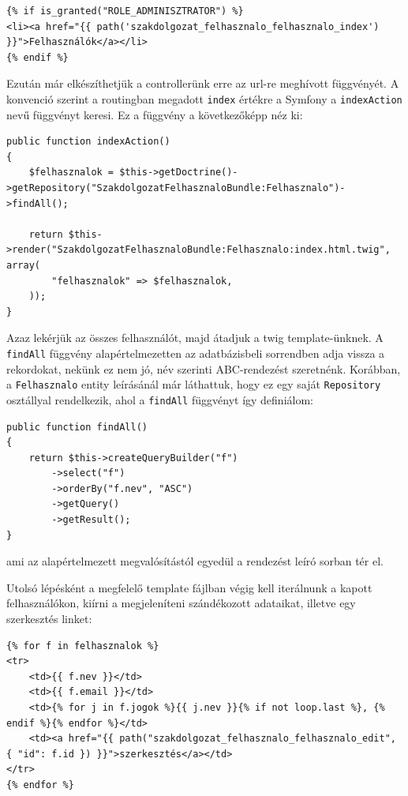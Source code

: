 \documentclass[a4paper,12pt,oneside]{report}
\begin{document}
\begin{lstlisting}
{% if is_granted("ROLE_ADMINISZTRATOR") %}
<li><a href="{{ path('szakdolgozat_felhasznalo_felhasznalo_index') }}">Felhasználók</a></li>
{% endif %}
\end{lstlisting}

Ezután már elkészíthetjük a controllerünk erre az url-re meghívott függvényét. A konvenció szerint a routingban megadott {\tt index} értékre a Symfony a {\tt indexAction} nevű függvényt keresi. Ez a függvény a következőképp néz ki:

\begin{lstlisting}
public function indexAction()
{
    $felhasznalok = $this->getDoctrine()->getRepository("SzakdolgozatFelhasznaloBundle:Felhasznalo")->findAll();

    return $this->render("SzakdolgozatFelhasznaloBundle:Felhasznalo:index.html.twig", array(
        "felhasznalok" => $felhasznalok,
    ));
}
\end{lstlisting}

Azaz lekérjük az összes felhasználót, majd átadjuk a twig template-ünknek. A {\tt findAll} függvény alapértelmezetten az adatbázisbeli sorrendben adja vissza a rekordokat, nekünk ez nem jó, név szerinti ABC-rendezést szeretnénk. Korábban, a {\tt Felhasznalo} entity leírásánál már láthattuk, hogy ez egy saját {\tt Repository} osztállyal rendelkezik, ahol a {\tt findAll} függvényt így definiálom:

\begin{lstlisting}
public function findAll()
{
    return $this->createQueryBuilder("f")
        ->select("f")
        ->orderBy("f.nev", "ASC")
        ->getQuery()
        ->getResult();
}
\end{lstlisting}

ami az alapértelmezett megvalósítástól egyedül a rendezést leíró sorban tér el.

Utolsó lépésként a megfelelő template fájlban végig kell iterálnunk a kapott felhasználókon, kiírni a megjeleníteni szándékozott adataikat, illetve egy szerkesztés linket:

\begin{lstlisting}
{% for f in felhasznalok %}
<tr>
    <td>{{ f.nev }}</td>
    <td>{{ f.email }}</td>
    <td>{% for j in f.jogok %}{{ j.nev }}{% if not loop.last %}, {% endif %}{% endfor %}</td>
    <td><a href="{{ path("szakdolgozat_felhasznalo_felhasznalo_edit", { "id": f.id }) }}">szerkesztés</a></td>
</tr>
{% endfor %}
\end{lstlisting}
\end{document}
